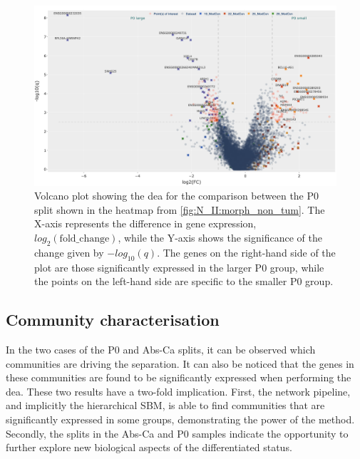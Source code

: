 \begin{figure}    
    \centering
    \includegraphics[width=1.0\textwidth,height=1.0\textheight,keepaspectratio]{Sections/Network_II/resources/non_tum/p0_split_dea.png}
    \caption[Volcano plot between the P0 splits]{Volcano plot showing the \acrlong{dea} for the comparison between the P0 split shown in the heatmap from \cref{fig:N_II:morph_non_tum}. The X-axis represents the difference in gene expression, $log_2(\text{fold\_change})$, while the Y-axis shows the significance of the change given by $-log_{10}(q)$. The genes on the right-hand side of the plot are those significantly expressed in the larger P0 group, while the points on the left-hand side are specific to the smaller P0 group.}
    \label{fig:N_II:p0_split}
\end{figure}

\subsection{Community characterisation} \label{s:N_II:comm_charact}

In the two cases of the P0 and Abs-Ca splits, it can be observed which communities are driving the separation. It can also be noticed that the genes in these communities are found to be significantly expressed when performing the \acrlong{dea}. These two results have a two-fold implication. First, the network pipeline, and implicitly the hierarchical SBM, is able to find communities that are significantly expressed in some groups, demonstrating the power of the method. Secondly, the splits in the Abs-Ca and P0 samples indicate the opportunity to further explore new biological aspects of the differentiated status.

